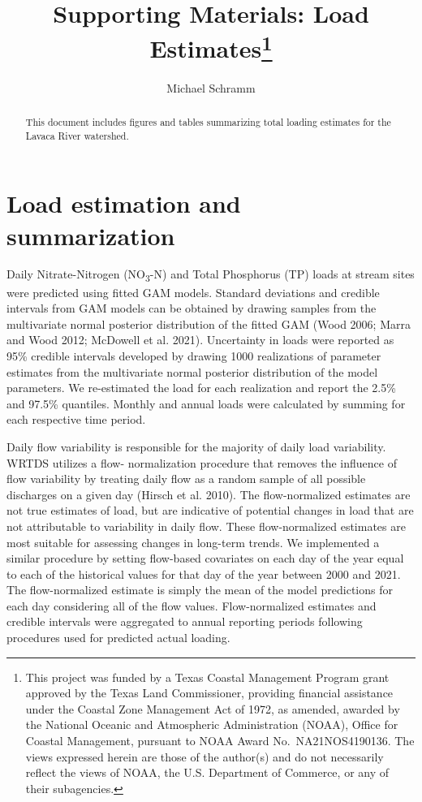 \documentclass[
]{article}
\title{Supporting Materials: Load Estimates\thanks{This project was
funded by a Texas Coastal Management Program grant approved by the Texas
Land Commissioner, providing financial assistance under the Coastal Zone
Management Act of 1972, as amended, awarded by the National Oceanic and
Atmospheric Administration (NOAA), Office for Coastal Management,
pursuant to NOAA Award No.~NA21NOS4190136. The views expressed herein
are those of the author(s) and do not necessarily reflect the views of
NOAA, the U.S. Department of Commerce, or any of their subagencies.}}
\author{Michael Schramm}
\date{}
\begin{document}
\maketitle
\begin{abstract}
This document includes figures and tables summarizing total loading
estimates for the Lavaca River watershed.
\end{abstract}
\ifdefined\Shaded\renewenvironment{Shaded}{\begin{tcolorbox}[borderline west={3pt}{0pt}{shadecolor}, sharp corners, boxrule=0pt, enhanced, breakable, frame hidden, interior hidden]}{\end{tcolorbox}}\fi

\hypertarget{load-estimation-and-summarization}{%
\section{Load estimation and
summarization}\label{load-estimation-and-summarization}}

Daily Nitrate-Nitrogen (NO\textsubscript{3}-N) and Total Phosphorus (TP)
loads at stream sites were predicted using fitted GAM models. Standard
deviations and credible intervals from GAM models can be obtained by
drawing samples from the multivariate normal posterior distribution of
the fitted GAM (Wood 2006; Marra and Wood 2012; McDowell et al. 2021).
Uncertainty in loads were reported as 95\% credible intervals developed
by drawing 1000 realizations of parameter estimates from the
multivariate normal posterior distribution of the model parameters. We
re-estimated the load for each realization and report the 2.5\% and
97.5\% quantiles. Monthly and annual loads were calculated by summing
for each respective time period.

Daily flow variability is responsible for the majority of daily load
variability. WRTDS utilizes a flow- normalization procedure that removes
the influence of flow variability by treating daily flow as a random
sample of all possible discharges on a given day (Hirsch et al. 2010).
The flow-normalized estimates are not true estimates of load, but are
indicative of potential changes in load that are not attributable to
variability in daily flow. These flow-normalized estimates are most
suitable for assessing changes in long-term trends. We implemented a
similar procedure by setting flow-based covariates on each day of the
year equal to each of the historical values for that day of the year
between 2000 and 2021. The flow-normalized estimate is simply the mean
of the model predictions for each day considering all of the flow
values. Flow-normalized estimates and credible intervals were aggregated
to annual reporting periods following procedures used for predicted
actual loading.
\end{document}

